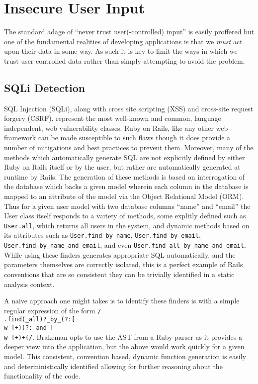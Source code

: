 \documentclass[conference]{IEEEtran}
\begin{document}
\section{Insecure User Input}

The standard adage of ``never trust user(-controlled) input'' is easily
proffered but one of the fundamental realities of developing applications
is that we \emph{must} act upon their data in some way.  As such it is key to
limit the ways in which we trust user-controlled data rather than simply
attempting to avoid the problem.

\subsection{SQLi Detection}

SQL Injection (SQLi), along with cross site scripting (XSS) and cross-site request forgery
(CSRF), represent the most well-known and common, language independent, web vulnerability
classes.  Ruby on Rails, like any other web framework can be made susceptible to such
flaws though it does provide a number of mitigations and best practices to prevent them.
Moreover, many of the methods which automatically generate SQL are not explicitly defined
by either Ruby on Rails itself or by the user, but rather are automatically generated at
runtime by Rails.  The generation of these methods is based on interrogation of the
database which backs a given model wherein each column in the database is mapped to an
attribute of the model via the Object Relational Model (ORM).  Thus for a given user model
with two database columns ``name'' and ``email'' the User class itself responds to a
variety of methods, some explitly defined such as \texttt{User.all}, which returns all
users in the system, and dynamic methods based on its attributes such as
\texttt{User.find\_by\_name}, \texttt{User.find\_by\_email},
\texttt{User.find\_by\_name\_and\_email}, and even
\texttt{User.find\_all\_by\_name\_and\_email}.  While using these finders generates
appropriate SQL automatically, and the parameters themselves are correctly isolated, this
is a perfect example of Rails conventions that are so consistent they can be trivially
identified in a static analysis context.

A naive approach one might takes is to identify these finders is with a simple regular
expression of the form \texttt{/\\.find(\_all)?\_by\_(?:[\\w\_]+)(?:\_and\_[\\w\_]+)+(/}.
Brakeman opts to use the AST from a Ruby parser as it provides a deeper view into the
application, but the above would work quickly for a given model.  This consistent,
convention based, dynamic function generation is easily and deterministically identified
allowing for further reasoning about the functionality of the code.
\end{document}
